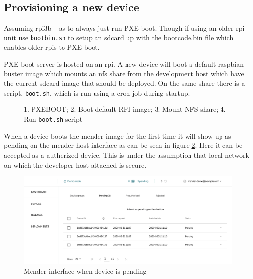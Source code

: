 \documentclass[../../main.tex]{subfiles}
\begin{document}
\subsection{Provisioning a new device}%
\label{sub:provisioning_a_new_device}
Assuming rpi3b+ as to always just run PXE boot. Though if using an older rpi unit use 
\texttt{bootbin.sh} to setup an sdcard up with the bootcode.bin file which
enables older rpis to PXE boot.

PXE boot server is hosted on an rpi. A new device will boot a default raspbian buster image
which mounts an nfs share from the development host which have the current sdcard image that 
should be deployed. On the same share there is a script, \texttt{boot.sh}, which is
run using a cron job during startup.\\

\usetikzlibrary {quotes}
\begin{figure}[h]
\begin{center}
\end{center}
\caption{1. PXEBOOT; 2. Boot default RPI image; 3. Mount NFS share;
	4. Run \texttt{boot.sh}  script}%
\label{fig:}
\end{figure}




When a device boots the mender image for the first time it will show up as pending on the mender
host interface as can be seen in figure \ref{fig:mender-ui-pending}.
Here it can be accepted as a authorized device.
This is under the assumption that local network on which the developer host attached is secure.

\begin{figure}[h]
	\centering
	\includegraphics[width=1\linewidth]{img/mender-ui-pending-edited.pdf}
	\caption{Mender interface when device is pending}%
	\label{fig:mender-ui-pending}
\end{figure}
\end{document}
